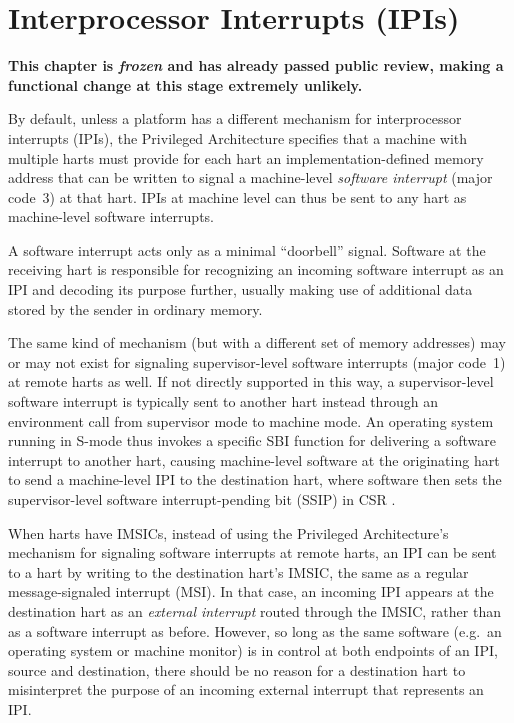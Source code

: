 
\chapter{Interprocessor Interrupts (IPIs)}
\label{ch:IPIs}

\textbf{%
This chapter is \emph{frozen} and has already passed public review,
making a functional change at this stage extremely unlikely.%
}
\bigskip

By default, unless a platform has a different mechanism for
interprocessor interrupts (IPIs), the {\RISCV} Privileged Architecture
specifies that a machine with multiple harts must provide for each hart
an implementation-defined memory address that can be written to signal
a machine-level \emph{software interrupt} (major code~3) at that hart.
IPIs at machine level can thus be sent to any hart as machine-level
software interrupts.

\begin{commentary}
A {\RISCV} software interrupt acts only as a minimal ``doorbell''
signal.
Software at the receiving hart is responsible for recognizing an
incoming software interrupt as an IPI and decoding its purpose further,
usually making use of additional data stored by the sender in ordinary
memory.
\end{commentary}

The same kind of mechanism (but with a different set of memory addresses) may
or may not exist for signaling supervisor-level software interrupts
(major code~1) at remote harts as well.
If not directly supported in this way, a supervisor-level software
interrupt is typically sent to another hart instead through an environment call
from supervisor mode to machine mode.
An operating system running in \mbox{S-mode} thus invokes a specific
SBI function for delivering a software interrupt to another hart,
causing machine-level software at the originating hart to send a
machine-level IPI to the destination hart, where software then sets the
supervisor-level software interrupt-pending bit (SSIP) in CSR .

When harts have IMSICs, instead of using the Privileged Architecture's
mechanism for signaling software interrupts at remote harts, an IPI
can be sent to a hart by writing to the destination hart's IMSIC, the
same as a regular message-signaled interrupt (MSI)\@.
In that case, an incoming IPI appears at the destination hart as an
\emph{external interrupt} routed through the IMSIC, rather than as a
software interrupt as before.
However, so long as the same software (e.g.\ an operating system or
machine monitor) is in control at both endpoints of an IPI, source
and destination, there should be no reason for a destination hart
to misinterpret the purpose of an incoming external interrupt that
represents an IPI.

